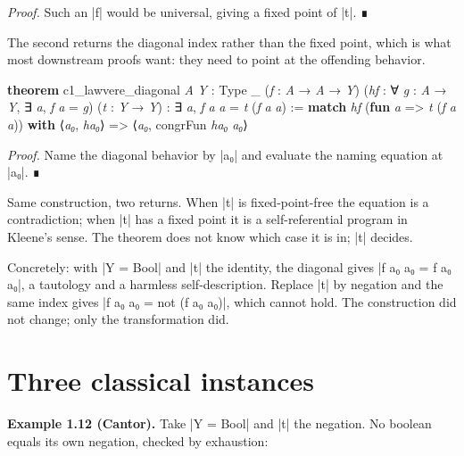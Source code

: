 \documentclass{memoir}
\begin{document}
\emph{Proof.} Such an \LeanVerb|f| would be universal, giving a fixed point of \LeanVerb|t|. ∎

The second returns the diagonal index rather than the fixed point, which is what
most downstream proofs want: they need to point at the offending behavior.

\begin{LeanVerbatim}
\textbf{theorem} c1_lawvere_diagonal \textit{A} \textit{Y} : Type _ (\textit{f} : \textit{A} → \textit{A} → \textit{Y})
    (\textit{hf} : ∀ \textit{g} : \textit{A} → \textit{Y}, ∃ \textit{a}, \textit{f} \textit{a} = \textit{g})
    (\textit{t} : \textit{Y} → \textit{Y}) : ∃ \textit{a}, \textit{f} \textit{a} \textit{a} = \textit{t} (\textit{f} \textit{a} \textit{a}) :=
  \textbf{match} \textit{hf} (\textbf{fun} \textit{a} => \textit{t} (\textit{f} \textit{a} \textit{a})) \textbf{with}
   ⟨\textit{a₀}, \textit{ha₀}⟩ => ⟨\textit{a₀}, congrFun \textit{ha₀} \textit{a₀}⟩

\end{LeanVerbatim}


\emph{Proof.} Name the diagonal behavior by \LeanVerb|a₀| and evaluate the naming equation at
\LeanVerb|a₀|. ∎

Same construction, two returns. When \LeanVerb|t| is fixed-point-free the equation is a
contradiction; when \LeanVerb|t| has a fixed point it is a self-referential program in
Kleene's sense. The theorem does not know which case it is in; \LeanVerb|t| decides.

Concretely: with \LeanVerb|Y = Bool| and \LeanVerb|t| the identity, the diagonal gives \LeanVerb|f a₀ a₀ = f a₀ a₀|,
a tautology and a harmless self-description. Replace \LeanVerb|t| by negation and the
same index gives \LeanVerb|f a₀ a₀ = not (f a₀ a₀)|, which cannot hold. The construction
did not change; only the transformation did.



\section{Three classical instances}\label{Two--Schemas--of--Impossibility-005F-005F-005F--Machine--Checked--Limits--of--Trustworthy--Machine--Learning-005F-005F-005F--and--Why--They--Tighten--with--Capability----The--Diagonal----Three--classical--instances}

\textbf{Example 1.12 (Cantor).} Take \LeanVerb|Y = Bool| and \LeanVerb|t| the negation. No boolean equals
its own negation, checked by exhaustion:
\end{document}

